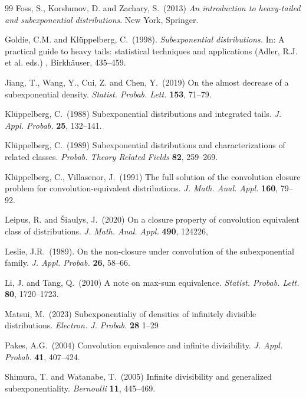 \documentclass[12pt,leqno]{amsart}
\newcommand{\1}{{\mathbf 1}}
\begin{document}
\begin{thebibliography}{99}
{\sc Foss, S., Korshunov, D. and Zachary, S.}\ (2013) 
{\em An introduction to heavy-tailed and subexponential distributions}.  
New York, Springer.

{\sc Goldie, C.M. and Kl\"uppelberg, C.}\ (1998). 
{\em Subexponential distributions.} 
In: A practical guide to heavy tails: statistical techniques and applications (Adler, R.J. et al. eds.)
, Birkh\"auser, 435--459.


{\sc Jiang, T., Wang, Y., Cui, Z. and Chen, Y.}\ (2019)
On the almost decrease of a subexponential density. 
{\em Statist. Probab. Lett.} {\bf 153}, 71--79.  

{\sc Kl\"uppelberg, C.}\ (1988) 
Subexponential distributions and integrated tails. 
{\em J. Appl. Probab.} {\bf 25}, 132--141. 

{\sc Kl\"uppelberg, C.}\ (1989) 
Subexponential distributions and characterizations of related classes.
{\em Probab. Theory Related Fields} {\bf 82}, 259--269. 

{\sc Kl\"uppelberg, C., Villasenor, J.}\ (1991)
The full solution of the convolution closure problem for convolution-equivalent distributions.
{\em J. Math. Anal. Appl.} {\bf 160}, 79--92. 

{\sc Leipus, R. and \v{S}iaulys, J.}\ (2020)
On a closure property of convolution equivalent class of distributions. 
{\em J. Math. Anal. Appl.} {\bf 490}, 124226,

{\sc Leslie, J.R.}\ (1989). 
On the non-closure under convolution of the subexponential family. 
{\em J. Appl. Probab.} {\bf 26}, 58--66.

{\sc Li, J. and Tang, Q.}\ (2010)
A note on max-sum equivalence. 
{\em Statist. Probab. Lett.} {\bf 80}, 1720--1723. 

{\sc Matsui, M.}\ (2023)
Subexponentialiy of densities of infinitely divisible distributions. 
{\em Electron. J. Probab.} {\bf 28} 1--29

{\sc Pakes, A.G.}\ (2004)  
Convolution equivalence and infinite divisibility. 
{\em J. Appl. Probab.} {\bf 41}, 407--424. 

{\sc Shimura, T. and Watanabe, T.}\ (2005)  
Infinite divisibility and generalized subexponentiality. 
{\em Bernoulli} {\bf 11}, 445--469.


\end{thebibliography}
\end{document}
